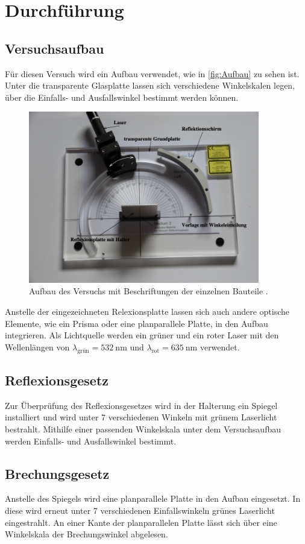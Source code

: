\section{Durchführung}
\label{sec:Durchführung}
\subsection{Versuchsaufbau}
Für diesen Versuch wird ein Aufbau verwendet, wie in \autoref{fig:Aufbau} zu sehen ist. Unter die transparente Glasplatte
lassen sich verschiedene Winkelskalen legen, über die Einfalls- und Ausfallswinkel bestimmt werden können.
\begin{figure}[H]
    \centering
    \includegraphics[height=7.5cm]{content/pics/Aufbau_1.png}
    \caption{Aufbau des Versuchs mit Beschriftungen der einzelnen Bauteile \cite{v400}.}
    \label{fig:Aufbau}
\end{figure}
Anstelle der eingezeichneten Relexionsplatte lassen sich auch andere optische Elemente, wie ein Prisma oder eine
planparallele Platte, in den Aufbau integrieren.
Als Lichtquelle werden ein grüner und ein roter Laser mit den Wellenlängen von 
$\lambda_{\text{grün}} = \qty{532}{\nano\metre}$ und $\lambda_{\text{rot}} = \qty{635}{\nano\metre}$ verwendet.

\subsection{Reflexionsgesetz}
Zur Überprüfung des Reflexionsgesetzes wird in der Halterung ein Spiegel installiert und wird unter 7 verschiedenen
Winkeln mit grünem Laserlicht bestrahlt. Mithilfe einer passenden Winkelskala unter dem Versuchsaufbau werden Einfalls-
und Ausfallswinkel bestimmt.

\subsection{Brechungsgesetz}
Anstelle des Spiegels wird eine planparallele Platte in den Aufbau eingesetzt. In diese wird erneut unter 7 verschiedenen
Einfallswinkeln grünes Laserlicht eingestrahlt. An einer Kante der planparallelen Platte lässt sich über eine Winkelskala
der Brechungswinkel abgelesen.

